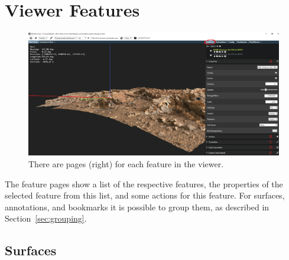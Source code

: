 \section{Viewer Features}

\begin{figure}[h]
    	\centering
    		\includegraphics[width=1\textwidth]{pics/SurfacesAI.png}
    	\caption[Viewer Features]{There are pages (right) for each feature in the viewer.}
    	\label{fig:featureMenu}
   \end{figure}
	
The feature pages show a list of the respective features, the properties of the selected feature from this list, and some actions for this feature.
For surfaces, annotations, and bookmarks it is possible to group them, as described in Section~\ref{sec:grouping}.
\subsection{Surfaces}
\label{sec:surfaces}

